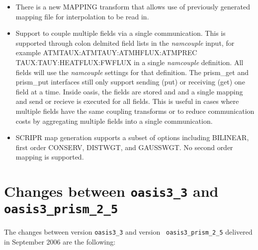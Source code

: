 \begin{itemize}
\begin{itemize}
\item There is a new MAPPING transform that allows use of previously generated
  mapping file for interpolation to be read in.
\item Support to couple multiple fields via a single communication.  This is supported through
  colon delmited field lists in the {\it namcouple} input, for example
  ATMTAUX:ATMTAUY:ATMHFLUX:ATMPREC TAUX:TAUY:HEATFLUX:FWFLUX in a single
  {\it namcouple} definition.  All fields will use the {\it namcouple} settings for
  that definition.  The prism\_get and prism\_put interfaces still only
  support sending (put) or receiving (get) one field at a time.  Inside
  oasis, the fields are stored and and a single mapping and send or recieve is 
  executed for all fields.  This is useful in cases where multiple fields
  have the same coupling transforms or to reduce communication costs
  by aggregating multiple fields into a single communication.  
\item SCRIPR map generation supports a subset of options including BILINEAR,
  first order CONSERV, DISTWGT, and GAUSSWGT.  No second order mapping is
  supported.
\end{itemize}

\end{itemize}


\section{Changes between {\tt oasis3\_3} and {\tt
oasis3\_prism\_2\_5}}

The changes between version {\tt oasis3\_3} and version {\tt
  oasis3\_prism\_2\_5} delivered in September 2006 are the following:


